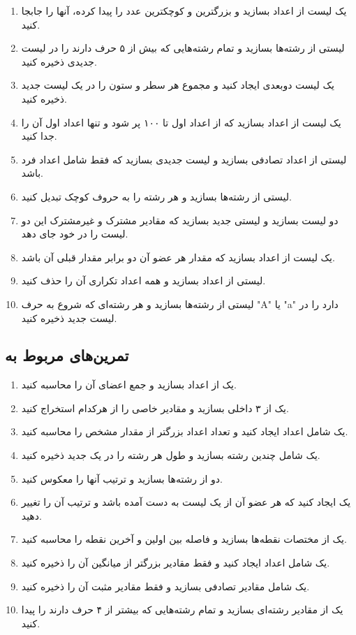 \documentclass[a4paper,12pt]{article}
\begin{document}
	\begin{enumerate}
		\item یک لیست از اعداد بسازید و بزرگترین و کوچکترین عدد را پیدا کرده، آنها را جابجا کنید.
		\item لیستی از رشته‌ها بسازید و تمام رشته‌هایی که بیش از ۵ حرف دارند را در لیست جدیدی ذخیره کنید.
		\item یک لیست دو‌بعدی ایجاد کنید و مجموع هر سطر و ستون را در یک لیست جدید ذخیره کنید.
		\item یک لیست از اعداد بسازید که از اعداد اول تا ۱۰۰ پر شود و تنها اعداد اول آن را جدا کنید.
		\item لیستی از اعداد تصادفی بسازید و لیست جدیدی بسازید که فقط شامل اعداد فرد باشد.
		\item لیستی از رشته‌ها بسازید و هر رشته را به حروف کوچک تبدیل کنید.
		\item دو لیست بسازید و لیستی جدید بسازید که مقادیر مشترک و غیرمشترک این دو لیست را در خود جای دهد.
		\item یک لیست از اعداد بسازید که مقدار هر عضو آن دو برابر مقدار قبلی آن باشد.
		\item لیستی از اعداد بسازید و همه اعداد تکراری آن را حذف کنید.
		\item لیستی از رشته‌ها بسازید و هر رشته‌ای که شروع به حرف "A" یا "a" دارد را در لیست جدید ذخیره کنید.
	\end{enumerate}
	
	\subsection*{تمرین‌های مربوط به }
	
	\begin{enumerate}
		\item یک  از اعداد بسازید و جمع اعضای آن را محاسبه کنید.
		\item یک  از ۳  داخلی بسازید و مقادیر خاصی را از هرکدام استخراج کنید.
		\item یک  شامل اعداد ایجاد کنید و تعداد اعداد بزرگتر از مقدار مشخص را محاسبه کنید.
		\item یک  شامل چندین رشته بسازید و طول هر رشته را در یک  جدید ذخیره کنید.
		\item دو  از رشته‌ها بسازید و ترتیب آنها را معکوس کنید.
		\item یک  ایجاد کنید که هر عضو آن از یک لیست به دست آمده باشد و ترتیب آن را تغییر دهید.
		\item یک  از مختصات نقطه‌ها بسازید و فاصله بین اولین و آخرین نقطه را محاسبه کنید.
		\item یک  شامل اعداد ایجاد کنید و فقط مقادیر بزرگتر از میانگین آن را ذخیره کنید.
		\item یک  شامل مقادیر تصادفی بسازید و فقط مقادیر مثبت آن را ذخیره کنید.
		\item یک  از مقادیر رشته‌ای بسازید و تمام رشته‌هایی که بیشتر از ۴ حرف دارند را پیدا کنید.
	\end{enumerate}
	
\end{document}
